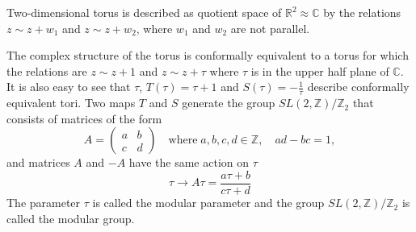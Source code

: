 \documentclass[a4paper,12pt]{article}
\theoremstyle{definition} \newtheorem{Def}{Definition}
\begin{document}
Two-dimensional torus is described as quotient space of $\mathbb{R}^2\approx \mathbb{C}$ by the relations $z\sim z+w_1$ and $z\sim z+w_2$, where $w_1$ and $w_2$ are not parallel. 

The complex structure of the torus is conformally equivalent to a torus for which the relations are $z\sim z+1$ and $z\sim z+\tau$ where $\tau$ is in the upper half plane of $\mathbb{C}$. It is also easy to see that $\tau$, $T(\tau)=\tau+1$ and $S(\tau)=-\frac{1}{\tau}$ describe conformally equivalent tori. Two maps $T$ and $S$ generate the group $SL(2,\mathbb{Z})/\mathbb{Z}_2$ that consists of matrices of the form
\begin{equation}
  \label{eq:99}
  A=
  \begin{pmatrix}
    a & b\\
    c & d 
  \end{pmatrix}
  \quad\mbox{where}\; a,b,c,d\in\mathbb{Z},\quad ad-bc=1,
\end{equation}
and matrices $A$ and $-A$ have the same action on $\tau$
\begin{equation}
  \label{eq:100}
  \tau\to A\tau=\frac{a\tau+b}{c\tau+d}
\end{equation}
The parameter $\tau$ is called the modular parameter and the group  $SL(2,\mathbb{Z})/\mathbb{Z}_2$ is called the modular group. 
\end{document}
